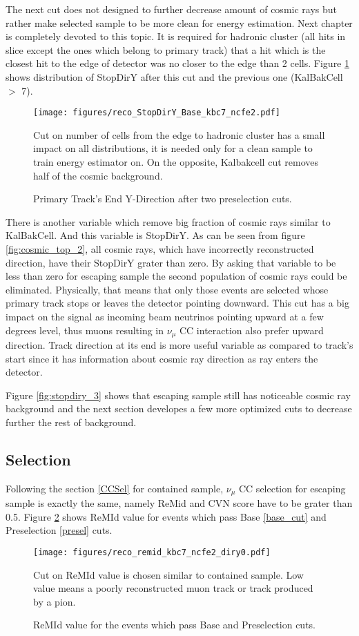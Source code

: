 The next cut does not designed to further decrease amount of cosmic rays but rather make selected sample 
to be more clean for energy estimation. Next chapter is completely devoted to this topic. It is required for 
hadronic cluster (all hits in slice except the ones which belong to primary track) that a hit which is the 
closest hit to the edge of detector was no closer to the edge than 2 cells. Figure \ref{fig:stopdiry_2} shows
distribution of StopDirY after this cut and the previous one (KalBakCell $>$ 7).
\begin{figure}[h]
\centering
\texttt{[image: figures/reco\_StopDirY\_Base\_kbc7\_ncfe2.pdf]}
\caption{Primary Track's End Y-Direction after two preselection cuts.}
{Cut on number of cells from the edge to hadronic cluster has a small impact on all distributions, it is needed
only for a clean sample to train energy estimator on. On the opposite, Kalbakcell cut removes half of the cosmic
background. }
\label{fig:stopdiry_2}
\end{figure} 

There is another variable which remove big fraction of cosmic rays similar to KalBakCell. And this variable 
is StopDirY. As can be seen from figure \ref{fig:cosmic_top_2}, all cosmic rays, which have incorrectly reconstructed
direction, have their StopDirY grater than zero. By asking that variable to be less than zero for escaping 
sample the second population of cosmic rays could be eliminated. Physically, that means that only those events
are selected whose primary track stops or leaves the detector pointing downward. This cut has a big impact
on the signal as incoming beam neutrinos pointing upward at a few degrees level, thus muons resulting in $\nu_\mu$
CC interaction also prefer upward direction. Track direction at its end is more useful variable as compared to
track's start since it has information about cosmic ray direction as ray enters the detector. 

Figure \ref{fig:stopdiry_3} shows that escaping sample still has noticeable cosmic ray background and the next 
section developes a few more optimized cuts to decrease further the rest of background.

\subsection{Selection}
Following the section \ref{CCSel} for contained sample, $\nu_\mu$ CC selection for escaping sample is exactly 
the same, namely ReMid and CVN score have to be grater than 0.5. Figure \ref{fig:remid} shows ReMId value for
events which pass Base \ref{base_cut} and Preselection \ref{presel} cuts. 
\begin{figure}[h]
\centering
\texttt{[image: figures/reco\_remid\_kbc7\_ncfe2\_diry0.pdf]}
\caption{ReMId value for the events which pass Base and Preselection cuts.}
{Cut on ReMId value is chosen similar to contained sample. Low value means a poorly reconstructed muon track or
track produced by a pion. }
\label{fig:remid}
\end{figure}

